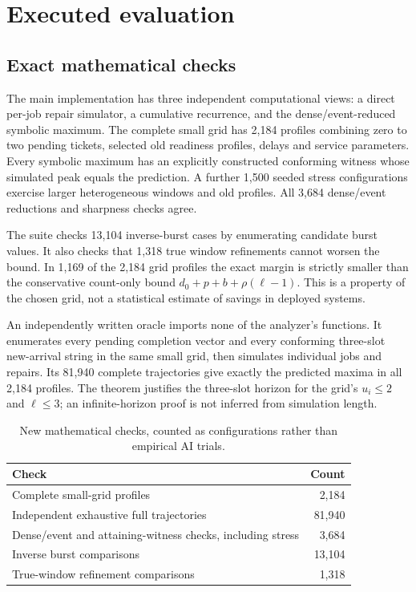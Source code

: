 \section{Executed evaluation}
\label{sec:eval}
\subsection{Exact mathematical checks}
The main implementation has three independent computational views: a direct per-job repair simulator, a cumulative recurrence, and the dense/event-reduced symbolic maximum. The complete small grid has 2,184 profiles combining zero to two pending tickets, selected old readiness profiles, delays and service parameters. Every symbolic maximum has an explicitly constructed conforming witness whose simulated peak equals the prediction. A further 1,500 seeded stress configurations exercise larger heterogeneous windows and old profiles. All 3,684 dense/event reductions and sharpness checks agree.

The suite checks 13,104 inverse-burst cases by enumerating candidate burst values. It also checks that 1,318 true window refinements cannot worsen the bound. In 1,169 of the 2,184 grid profiles the exact margin is strictly smaller than the conservative count-only bound $d_0+p+b+\rho(\ell-1)$. This is a property of the chosen grid, not a statistical estimate of savings in deployed systems.

An independently written oracle imports none of the analyzer's functions. It enumerates every pending completion vector and every conforming three-slot new-arrival string in the same small grid, then simulates individual jobs and repairs. Its 81,940 complete trajectories give exactly the predicted maxima in all 2,184 profiles. The theorem justifies the three-slot horizon for the grid's $u_i\le2$ and $\ell\le3$; an infinite-horizon proof is not inferred from simulation length.

\begin{table}[ht]
\centering\small
\caption{New mathematical checks, counted as configurations rather than empirical AI trials.}
\begin{tabular}{@{}lr@{}}\toprule
Check & Count\\\midrule
Complete small-grid profiles &2,184\\
Independent exhaustive full trajectories &81,940\\
Dense/event and attaining-witness checks, including stress &3,684\\
Inverse burst comparisons &13,104\\
True-window refinement comparisons &1,318\\\bottomrule
\end{tabular}
\end{table}

